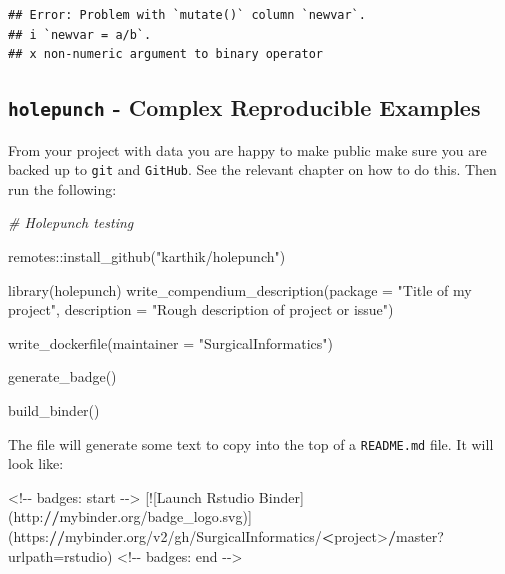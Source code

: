 \documentclass[
]{book}
\newenvironment{Shaded}{\begin{snugshade}}{\end{snugshade}}
\newcommand{\AttributeTok}[1]{\textcolor[rgb]{0.77,0.63,0.00}{#1}}
\newcommand{\CommentTok}[1]{\textcolor[rgb]{0.56,0.35,0.01}{\textit{#1}}}
\newcommand{\ErrorTok}[1]{\textcolor[rgb]{0.64,0.00,0.00}{\textbf{#1}}}
\newcommand{\FunctionTok}[1]{\textcolor[rgb]{0.00,0.00,0.00}{#1}}
\newcommand{\NormalTok}[1]{#1}
\newcommand{\OtherTok}[1]{\textcolor[rgb]{0.56,0.35,0.01}{#1}}
\newcommand{\SpecialCharTok}[1]{\textcolor[rgb]{0.00,0.00,0.00}{#1}}
\newcommand{\StringTok}[1]{\textcolor[rgb]{0.31,0.60,0.02}{#1}}
\begin{document}
\begin{verbatim}
## Error: Problem with `mutate()` column `newvar`.
## i `newvar = a/b`.
## x non-numeric argument to binary operator
\end{verbatim}

\hypertarget{holepunch---complex-reproducible-examples}{%
\subsection{\texorpdfstring{\texttt{holepunch} - Complex Reproducible Examples}{holepunch - Complex Reproducible Examples}}\label{holepunch---complex-reproducible-examples}}

From your project with data you are happy to make public make sure you are backed up to \texttt{git} and \texttt{GitHub}. See the relevant chapter on how to do this. Then run the following:

\begin{Shaded}
\begin{Highlighting}[]
\CommentTok{\# Holepunch testing}

\NormalTok{remotes}\SpecialCharTok{::}\FunctionTok{install\_github}\NormalTok{(}\StringTok{"karthik/holepunch"}\NormalTok{)}

\FunctionTok{library}\NormalTok{(holepunch)}
\FunctionTok{write\_compendium\_description}\NormalTok{(}\AttributeTok{package =} \StringTok{"Title of my project"}\NormalTok{, }
                             \AttributeTok{description =} \StringTok{"Rough description of project or issue"}\NormalTok{)}

\FunctionTok{write\_dockerfile}\NormalTok{(}\AttributeTok{maintainer =} \StringTok{"SurgicalInformatics"}\NormalTok{)}

\FunctionTok{generate\_badge}\NormalTok{()}

\FunctionTok{build\_binder}\NormalTok{()}
\end{Highlighting}
\end{Shaded}

The file will generate some text to copy into the top of a \texttt{README.md} file. It will look like:

\begin{Shaded}
\begin{Highlighting}[]
\SpecialCharTok{\textless{}!{-}{-}}\NormalTok{ badges}\SpecialCharTok{:}\NormalTok{ start }\SpecialCharTok{{-}}\OtherTok{{-}\textgreater{}}
\NormalTok{[}\SpecialCharTok{!}\NormalTok{[Launch Rstudio Binder](http}\SpecialCharTok{:}\ErrorTok{//}\NormalTok{mybinder.org}\SpecialCharTok{/}\NormalTok{badge\_logo.svg)](https}\SpecialCharTok{:}\ErrorTok{//}\NormalTok{mybinder.org}\SpecialCharTok{/}\NormalTok{v2}\SpecialCharTok{/}\NormalTok{gh}\SpecialCharTok{/}\NormalTok{SurgicalInformatics}\SpecialCharTok{/}\ErrorTok{\textless{}}\NormalTok{project}\SpecialCharTok{\textgreater{}}\ErrorTok{/}\NormalTok{master?}\AttributeTok{urlpath=}\NormalTok{rstudio)}
\SpecialCharTok{\textless{}!{-}{-}}\NormalTok{ badges}\SpecialCharTok{:}\NormalTok{ end }\SpecialCharTok{{-}}\OtherTok{{-}\textgreater{}}
\end{Highlighting}
\end{Shaded}
\end{document}

